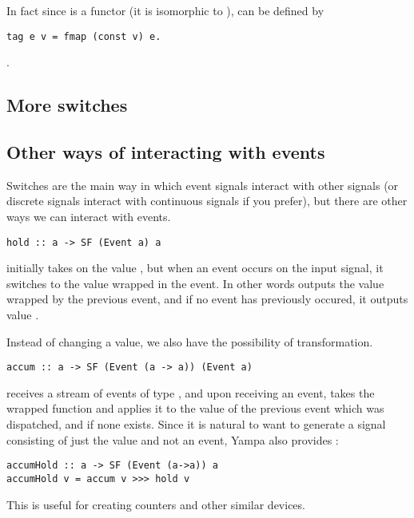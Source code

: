 \noindent In fact since  is a functor (it is isomorphic to ),  can be defined by

\begin{lstlisting}
tag e v = fmap (const v) e.
\end{lstlisting}.


\subsection{More switches}

\subsection{Other ways of interacting with events}
Switches are the main way in which event signals interact with other signals (or discrete signals interact with continuous signals if you prefer), but there are other ways we can interact with events.

\begin{lstlisting}
hold :: a -> SF (Event a) a
\end{lstlisting}

\noindent {} initially takes on the value , but when an event occurs on the input signal, it switches to the value wrapped in the event. In other words  outputs the value wrapped by the previous event, and if no event has previously occured, it outputs value .

Instead of changing a value, we also have the possibility of transformation.

\begin{lstlisting}
accum :: a -> SF (Event (a -> a)) (Event a)
\end{lstlisting}

\noindent {} receives a stream of events of type , and upon receiving an event, takes the wrapped function and applies it to the value of the previous event which was dispatched, and  if none exists. Since it is natural to want to generate a signal consisting of just the value and not an event, Yampa also provides :

\begin{lstlisting}
accumHold :: a -> SF (Event (a->a)) a
accumHold v = accum v >>> hold v
\end{lstlisting}

\noindent This is useful for creating counters and other similar devices.
